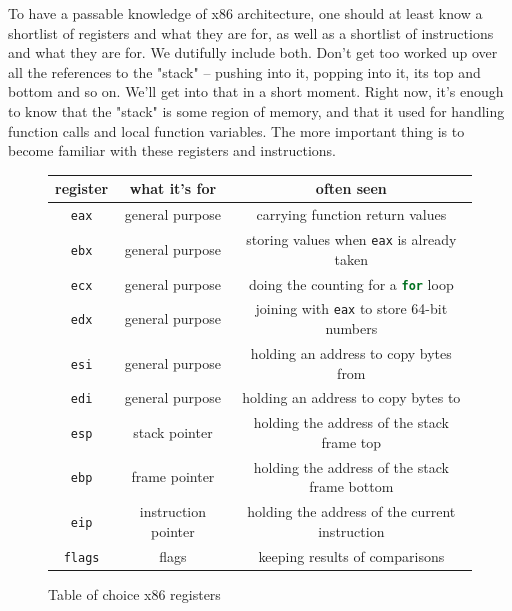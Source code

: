 \documentclass{article}
\newcommand{\xcode}[2]{\colorbox{ubuntuback}{\lstinline[language=#1]|#2|}}
\newcommand{\asm}[1]{\xcode{{[x86masm]assembler}}{#1}}
\begin{document}
To have a passable knowledge of x86 architecture, one should at least know a shortlist of registers and what they are for, as well as a shortlist of instructions and what they are for. We dutifully include both. Don't get too worked up over all the references to the "stack" -- pushing into it, popping into it, its top and bottom and so on. We'll get into that in a short moment. Right now, it's enough to know that the "stack" is some region of memory, and that it used for handling function calls and local function variables. The more important thing is to become familiar with these registers and instructions.

\begin{figure}[H]
\centering
\begin{tabular}{|c|c|c|}
    \hline
    \textbf{register} & \textbf{what it's for} & \textbf{often seen} \\
    \hline 
    \asm{eax} & general purpose & carrying function return values \\
    \hline 
    \asm{ebx} & general purpose & storing values when \asm{eax} is already taken \\
    \hline 
    \asm{ecx} & general purpose & doing the counting for a \xcode{C}{for} loop \\
    \hline 
    \asm{edx} & general purpose & joining with \asm{eax} to store 64-bit numbers \\
    \hline 
    \asm{esi} & general purpose & holding an address to copy bytes from \\
    \hline 
    \asm{edi} & general purpose & holding an address to copy bytes to \\
    \hline 
    \asm{esp} & stack pointer & holding the address of the stack frame top \\
    \hline 
    \asm{ebp} & frame pointer & holding the address of the stack frame bottom \\
    \hline 
    \asm{eip} & instruction pointer & holding the address of the current instruction \\
    \hline 
    \asm{flags} & flags & keeping results of comparisons \\
    \hline 
\end{tabular}
    \caption{Table of choice x86 registers}
\end{figure}
\end{document}
